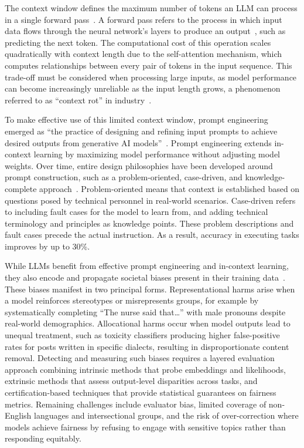 \documentclass[
english,                 %
bibtex,                  %
]{kththesis}
\numberwithin{listing}{chapter}
\begin{document}
The context window defines the maximum number of tokens an \gls{LLM} can process in a single forward pass~\cite{ratner_parallel_2023}. A forward pass refers to the process in which input data flows through the neural network's layers to produce an output~\cite{schmidhuber_deep_2015}, such as predicting the next token. The computational cost of this operation scales quadratically with context length due to the self-attention mechanism, which computes relationships between every pair of tokens in the input sequence. This trade-off must be considered when processing large inputs, as model performance can become increasingly unreliable as the input length grows, a phenomenon referred to as ``context rot'' in industry~\cite{hong_context_2025}.

To make effective use of this limited context window, prompt engineering emerged as ``the practice of designing and refining input prompts to achieve desired outputs from generative \gls{AI} models''~\cite{cinar_prompt_2026}. Prompt engineering extends in-context learning by maximizing model performance without adjusting model weights. Over time, entire design philosophies have been developed around prompt construction, such as a problem-oriented, case-driven, and knowledge-complete approach~\cite{wu_improving_2025}. Problem-oriented means that context is established based on questions posed by technical personnel in real-world scenarios. Case-driven refers to including fault cases for the model to learn from, and adding technical terminology and principles as knowledge points. These problem descriptions and fault cases precede the actual instruction. As a result, accuracy in executing tasks improves by up to 30\%.

While \glspl{LLM} benefit from effective prompt engineering and in-context learning, they also encode and propagate societal biases present in their training data~\cite{gao_detecting_2026}. These biases manifest in two principal forms. Representational harms arise when a model reinforces stereotypes or misrepresents groups, for example by systematically completing ``The nurse said that\ldots'' with male pronouns despite real-world demographics. Allocational harms occur when model outputs lead to unequal treatment, such as toxicity classifiers producing higher false-positive rates for posts written in specific dialects, resulting in disproportionate content removal. Detecting and measuring such biases requires a layered evaluation approach combining intrinsic methods that probe embeddings and likelihoods, extrinsic methods that assess output-level disparities across tasks, and certification-based techniques that provide statistical guarantees on fairness metrics. Remaining challenges include evaluator bias, limited coverage of non-English languages and intersectional groups, and the risk of over-correction where models achieve fairness by refusing to engage with sensitive topics rather than responding equitably.
\end{document}
